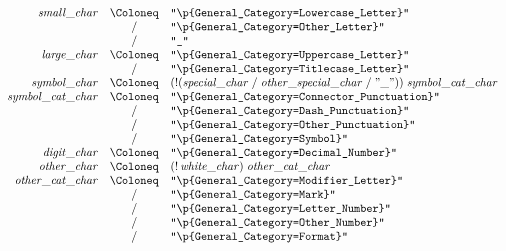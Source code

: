 \begin{align*}
    \begin{array}{rcll}
        \mathit{small\_char}
        &\Coloneq &\texttt{"\textbackslash p\{General\_Category=Lowercase\_Letter\}"} \\
        &\mathrel{/} &\texttt{"\textbackslash p\{General\_Category=Other\_Letter\}"} \\
        &\mathrel{/} &\texttt{"\_"} \\
        \mathit{large\_char}
        &\Coloneq &\texttt{"\textbackslash p\{General\_Category=Uppercase\_Letter\}"} \\
        &\mathrel{/} &\texttt{"\textbackslash p\{General\_Category=Titlecase\_Letter\}"} \\
        \mathit{symbol\_char}
        &\Coloneq &(\mathop{!} (\mathit{special\_char} \mathrel{/} \mathit{other\_special\_char} \mathrel{/} "\_"))\; \mathit{symbol\_cat\_char} \\
        \mathit{symbol\_cat\_char}
        &\Coloneq &\texttt{"\textbackslash p\{General\_Category=Connector\_Punctuation\}"} \\
        &\mathrel{/} &\texttt{"\textbackslash p\{General\_Category=Dash\_Punctuation\}"} \\
        &\mathrel{/} &\texttt{"\textbackslash p\{General\_Category=Other\_Punctuation\}"} \\
        &\mathrel{/} &\texttt{"\textbackslash p\{General\_Category=Symbol\}"} \\
        \mathit{digit\_char}
        &\Coloneq &\texttt{"\textbackslash p\{General\_Category=Decimal\_Number\}"} \\
        \mathit{other\_char}
        &\Coloneq &(\mathop{!} \mathit{white\_char})\; \mathit{other\_cat\_char} \\
        \mathit{other\_cat\_char}
        &\Coloneq &\texttt{"\textbackslash p\{General\_Category=Modifier\_Letter\}"} \\
        &\mathrel{/} &\texttt{"\textbackslash p\{General\_Category=Mark\}"} \\
        &\mathrel{/} &\texttt{"\textbackslash p\{General\_Category=Letter\_Number\}"} \\
        &\mathrel{/} &\texttt{"\textbackslash p\{General\_Category=Other\_Number\}"} \\
        &\mathrel{/} &\texttt{"\textbackslash p\{General\_Category=Format\}"}
    \end{array}
\end{align*}

